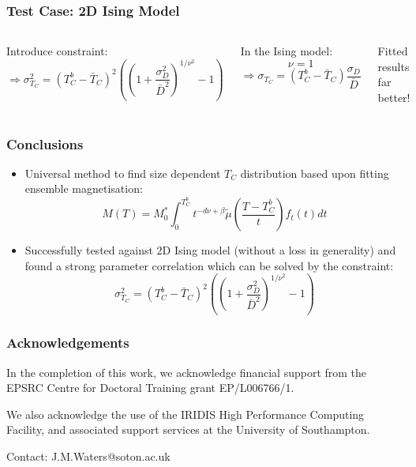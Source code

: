 \documentclass{beamer}
\begin{document}
\begin{frame}
	\frametitle{Test Case: 2D Ising Model}
	\begin{columns}
	\column{7cm}
		Introduce constraint\footnotemark[5]:
		$$
		\Rightarrow \sigma_{T_C}^2 = (T_C^b - \bar{T}_C)^2\left(\left(1 + \frac{\sigma_D^2}{\bar{D}^2}\right)^{1/\nu^2}-1\right)
		$$
		
		In the Ising model:
		$$
		\nu = 1
		$$
		$$
		\Rightarrow \sigma_{T_C} = (T_C^b - \bar{T}_C)\frac{\sigma_D}{\bar{D}}
		$$
		\begin{center}\vspace{2mm}
		
		Fitted results far better!
		\end{center}
	\column{5cm}
		\includegraphics[width=4.5cm]{Images/distros}
		
		\includegraphics[width=4.5cm]{Images/constr}
	\end{columns}
\end{frame}

\begin{frame}
	\frametitle{Conclusions}
	\small{
	\begin{itemize}
		\item{Universal method to find size dependent $T_C$ distribution based upon fitting ensemble magnetisation:}
		$$
		M(T) = M_0^*\int_0^{T_C^b} t^{-d\nu +\beta} \tilde{\mu}\left(\frac{T-T_C^b}{t}\right) f_t(t) dt
		$$
		\item{Successfully tested against 2D Ising model (without a loss in generality) and found a strong parameter correlation which can be solved by the constraint:}
		$$
		\sigma_{T_C}^2 = (T_C^b - \bar{T}_C)^2\left(\left(1 + \frac{\sigma_D^2}{\bar{D}^2}\right)^{1/\nu^2}-1\right)
		$$
	\end{itemize}}
\end{frame}

\begin{frame}
	\frametitle{Acknowledgements}
	In the completion of this work, we acknowledge financial support from the EPSRC Centre for Doctoral Training grant EP/L006766/1. \newline
	
	We also acknowledge the use of the IRIDIS High Performance Computing Facility, and associated support services at the University of
Southampton. \newline

	Contact: J.M.Waters@soton.ac.uk
\end{frame}
\end{document}

